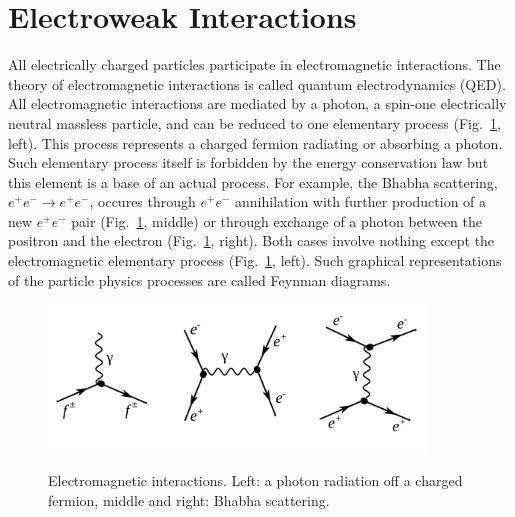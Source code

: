 \section{Electroweak Interactions}
\label{sec:Intro_Electroweak}

All electrically charged particles participate in electromagnetic interactions. The theory of electromagnetic interactions is called quantum electrodynamics (QED). All electromagnetic interactions are mediated by a photon, a spin-one electrically neutral massless particle, and can be reduced to one elementary process (Fig.~\ref{fig:feynmEM}, left). This process represents a charged fermion radiating or absorbing a photon. Such elementary process itself is forbidden by the energy conservation law but this element is a base of an actual process. For example, the Bhabha scattering, $e^+e^- \rightarrow e^+e^-$, occures through $e^+e^-$ annihilation with further production of a new $e^+e^-$ pair (Fig.~\ref{fig:feynmEM}, middle) or through exchange of a photon between the positron and the electron (Fig.~\ref{fig:feynmEM}, right). Both cases involve nothing except the electromagnetic elementary process (Fig.~\ref{fig:feynmEM}, left). Such graphical representations of the particle physics processes are called Feynman diagrams. 

\begin{figure}[htb]
  \begin{center}
    {\includegraphics[width=0.90\textwidth]{../figs/Intro/feynmEM.png}}
    \caption{Electromagnetic interactions. Left: a photon radiation off a charged fermion, middle and right: Bhabha scattering. }
    \label{fig:feynmEM}
  \end{center}
\end{figure}

